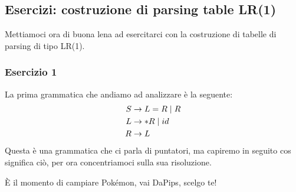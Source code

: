 \documentclass[class=book, crop=false, oneside, 12pt]{standalone}
\begin{document}
\subsection{Esercizi: costruzione di parsing table LR(1)}
Mettiamoci ora di buona lena ad esercitarci con la costruzione di tabelle di parsing di tipo LR(1).

\subsubsection{Esercizio 1}
La prima grammatica che andiamo ad analizzare è la seguente:
\begin{align}
    \label{gr:pointers-grammar}
    S &\to L = R \mid R \\
    L &\to *R \mid id \nonumber \\ \notag
    R &\to L \notag
\end{align}
Questa è una grammatica che ci parla di puntatori, ma capiremo in seguito cos significa ciò, per ora concentriamoci sulla sua risoluzione.

È il momento di campiare Pokémon, vai DaPips, scelgo te!
\end{document}
